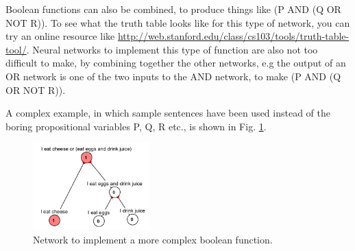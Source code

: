 Boolean functions can also be combined, to produce things like (P AND (Q OR NOT R)). To see what the truth table looks like for this type of network, you can try an online resource like \url{http://web.stanford.edu/class/cs103/tools/truth-table-tool/}. Neural networks to implement this type of function are also not too difficult to make, by combining together the other networks, e.g the output of an OR network is one of the two inputs to the AND network, to make (P AND (Q OR NOT R)).

A complex example, in which sample sentences have been used instead of the boring propositional variables P, Q, R etc., is shown in Fig. \ref{logic_gates_ex}.

\begin{figure}[h]
\centering
\includegraphics[width=0.4\textwidth]{images/logic_gates_ex.png}
\caption[Simbrain screenshot]{Network to implement a more complex boolean function.}
\label{logic_gates_ex}
\end{figure}

